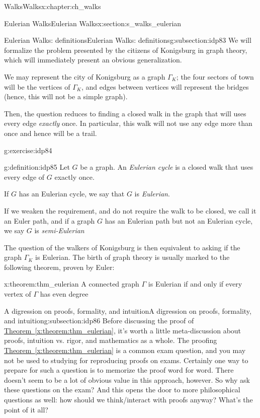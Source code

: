 \documentclass[oneside,10pt,]{book}
\newcommand{\xreffont}{\relax}
\numberwithin{equation}{section}
\begin{document}
\begin{chapterptx}{Walks}{}{Walks}{}{}{x:chapter:ch_walks}
\begin{sectionptx}{Eulerian Walks}{}{Eulerian Walks}{}{}{x:section:s_walks_eulerian}
\begin{subsectionptx}{Eulerian Walks: definitions}{}{Eulerian Walks: definitions}{}{}{g:subsection:idp83}
We will formalize the problem presented by the citizens of Konigsburg in graph theory, which will immediately present an obvious generalization.%
\par
We may represent the city of Konigsburg as a graph \(\Gamma_K\); the four sectors of town will be the vertices of \(\Gamma_K\), and edges between vertices will represent the bridges (hence, this will not be a simple graph).%
\par
Then, the question reduces to finding a closed walk in the graph that will uses every edge \emph{exactly} once. In particular, this walk will not use any edge more than once and hence will be a trail.%
\begin{inlineexercise}{}{g:exercise:idp84}%
\end{inlineexercise}%
\begin{definition}{}{g:definition:idp85}%
Let \(G\) be a graph.  An \emph{Eulerian cycle} is a closed walk that uses every edge of \(G\) exactly once.%
\par
If \(G\) has an Eulerian cycle, we say that \(G\) is \emph{Eulerian}.%
\par
If we weaken the requirement, and do not require the walk to be closed, we call it an Euler path, and if a graph \(G\) has an Eulerian path but not an Eulerian cycle, we say \(G\) is \emph{semi-Eulerian}%
\end{definition}
The question of the walkers of Konigsburg is then equivalent to asking if the graph \(\Gamma_K\) is Eulerian. The birth of graph theory is usually marked to the following theorem, proven by Euler:%
\begin{theorem}{}{}{x:theorem:thm_eulerian}%
A connected graph \(\Gamma\) is Eulerian if and only if every vertex of \(\Gamma\) has even degree%
\end{theorem}
\end{subsectionptx}
%
%
\typeout{************************************************}
\typeout{************************************************}
%
\begin{subsectionptx}{A digression on proofs, formality, and intuition}{}{A digression on proofs, formality, and intuition}{}{}{g:subsection:idp86}
Before discussing the proof of \hyperref[x:theorem:thm_eulerian]{Theorem~{\xreffont\ref{x:theorem:thm_eulerian}}}, it's worth a little meta-discussion about proofs, intuition vs. rigor, and mathematics as a whole.  The proofing \hyperref[x:theorem:thm_eulerian]{Theorem~{\xreffont\ref{x:theorem:thm_eulerian}}} is a common exam question, and you may not be used to studying for reproducing proofs on exams.  Certainly one way to prepare for such a question is to memorize the proof word for word.  There doesn't seem to be a lot of obvious value in this approach, however.  So why ask these questions on the exam? And this opens the door to more philosophical questions as well: how should we think\slash{}interact with proofs anyway?  What's the point of it all?%

\end{subsectionptx}
\end{sectionptx}
\end{chapterptx}
\end{document}
